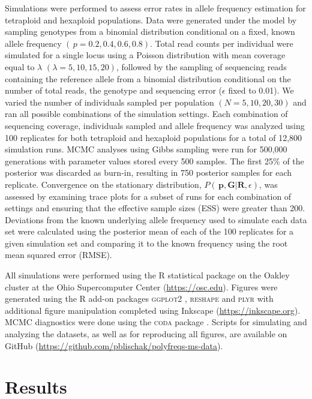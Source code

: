 \documentclass[11pt,english,letterpaper,oneside]{article}
\begin{document}
Simulations were performed to assess error rates in allele frequency estimation for tetraploid and hexaploid populations. Data were generated under the model by sampling genotypes from a binomial distribution conditional on a fixed, known allele frequency $(\,p = 0.2, 0.4, 0.6, 0.8)$. Total read counts per individual were simulated for a single locus using a Poisson distribution with mean coverage equal to $\lambda$ $(\lambda = 5, 10, 15, 20)$, followed by the sampling of sequencing reads containing the reference allele from a binomial distribution conditional on the number of total reads, the genotype and sequencing error ($\epsilon$ fixed to 0.01). We varied the number of individuals sampled per population $(N = 5, 10, 20, 30)$ and ran all possible combinations of the simulation settings. Each combination of sequencing coverage, individuals sampled and allele frequency was analyzed using 100 replicates for both tetraploid and hexaploid populations for a total of 12,800 simulation runs. MCMC analyses using Gibbs sampling were run for 500,000 generations with parameter values stored every 500 samples. The first 25\% of the posterior was discarded as burn-in, resulting in 750 posterior samples for each replicate. Convergence on the stationary distribution, $P(\,\bm{p},\bm{G}|\bm{R},\epsilon)$, was assessed by examining trace plots for a subset of runs for each combination of settings and ensuring that the effective sample sizes (ESS) were greater than 200. Deviations from the known underlying allele frequency used to simulate each data set were calculated using the posterior mean of each of the 100 replicates for a given simulation set and comparing it to the known frequency using the root mean squared error (RMSE).
\medskip

All simulations were performed using the R statistical package \citep{r2014} on the Oakley cluster at the Ohio Supercomputer Center (\url{https://osc.edu}). Figures were generated using the R add-on packages \textsc{ggplot2} \citep{wickham2009ggplot2}, \textsc{reshape} \citep{wickham2011plyr} and \textsc{plyr} \citep{wickham2007reshape} with additional figure manipulation completed using Inkscape (\url{https://inkscape.org}). MCMC diagnostics were done using the \textsc{coda} package \citep{plummer2006coda}. Scripts for simulating and analyzing the datasets, as well as for reproducing all figures, are available on GitHub (\url{https://github.com/pblischak/polyfreqs-ms-data}).
\medskip

\section*{Results}               %
\end{document}
